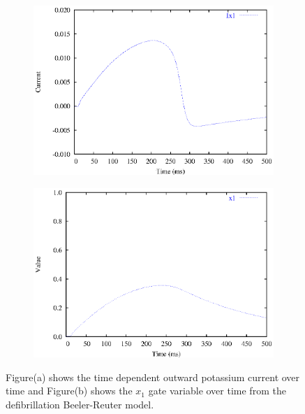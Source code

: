 \begin{figure}[hbtp] 
  \centering
  \begin{subfigure}[b]{0.45\linewidth}
    \centering
    \includegraphics[width=\textwidth]{cardiac_electrophysiology/epsfiles/BRDR_Ix1.eps}
    \caption{}
  \end{subfigure}
  \hfill
  \begin{subfigure}[b]{0.45\linewidth}
    \centering
    \includegraphics[width=\textwidth]{cardiac_electrophysiology/epsfiles/BRDR_x1.eps}
    \caption{}
  \end{subfigure}
  \caption[Defibrillation Beeler-Reuter time dependent potassium current]{Figure(a) shows the
    time dependent outward potassium current over time and Figure(b) shows the
    $x_1$ gate variable over time from the defibrillation Beeler-Reuter model.}
  \label{fig:BRDR_Ix1_traces}
\end{figure}
%
